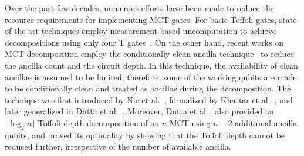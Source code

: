 \documentclass[sigconf]{acmart}
\begin{document}
Over the past few decades, numerous efforts have been made to reduce the resource requirements for implementing MCT gates. For basic Toffoli gates, state-of-the-art techniques employ measurement-based uncomputation to achieve decompositions using only four T gates~\cite{gidney2018quantum, jaques2020eurocrypt}. On the other hand, recent works on MCT decomposition employ the conditionally clean ancilla technique~\cite{nie2024arxiv, khattar2025quantum, dutta2025pra} to reduce the ancilla count and the circuit depth. In this technique, the availability of clean ancillae is assumed to be limited; therefore, some of the working qubits are made to be conditionally clean and treated as ancillae during the decomposition. The technique was first introduced by Nie et al.~\cite{nie2024arxiv}, formalized by Khattar et al.~\cite{khattar2025quantum}, and later generalized in Dutta et al.~\cite{dutta2025pra}. Moreover, Dutta et al.~\cite{dutta2025pra} also provided an $\lceil\log_2 n\rceil$ Toffoli-depth decomposition of an $n$-MCT using $n-2$ additional ancilla qubits, and proved its optimality by showing that the Toffoli depth cannot be reduced further, irrespective of the number of available ancilla.
\end{document}
